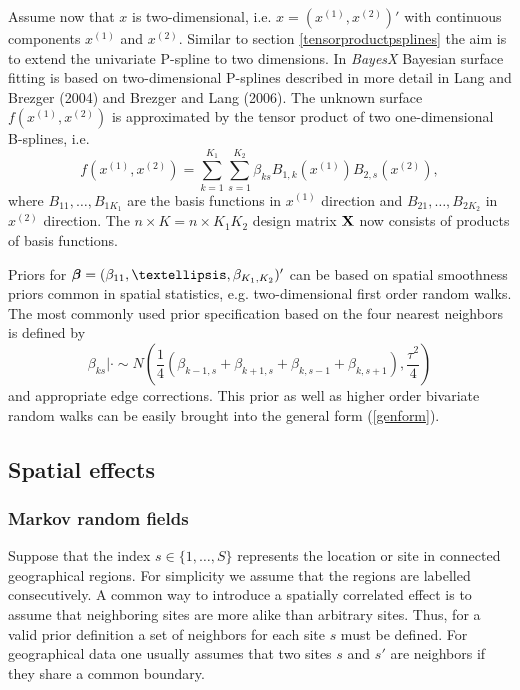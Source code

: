 \documentclass[11pt,a4paper,twoside]{bayesxarticle}
\begin{document}
Assume now that $x$ is two-dimensional, i.e. $x =
\left(x^{(1)},x^{(2)}\right)'$ with continuous components $x^{(1)}$
and $x^{(2)}$. Similar to section \ref{tensorproductpsplines} the
aim is to extend the univariate P-spline to two dimensions. In {\em
BayesX} Bayesian surface fitting is based on two-dimensional
P-splines described in more detail in Lang and Brezger (2004) and
Brezger and Lang (2006). The unknown surface $f(x^{(1)},x^{(2)})$ is
approximated by the tensor product of two one-dimensional B-splines,
i.e.
$$
f\left(x^{(1)},x^{(2)}\right) = \sum_{k=1}^{K_1}
\sum_{s=1}^{K_2} \beta_{ks} B_{1,k}(x^{(1)})
B_{2,s} (x^{(2)}),
$$
where $B_{11},\dots,B_{1K_1}$ are the basis functions in $x^{(1)}$ direction and
$B_{21},\dots,B_{2K_2}$ in $x^{(2)}$ direction.
The $n \times K = n \times K_1 K_2$ design matrix $\mathbf{X}$ now consists of
products of basis functions.

Priors for
$\betavec = (\beta_{11},\dots,\beta_{K_1,K_2})'$ can be based on
spatial smoothness priors common in spatial statistics, e.g.
two-dimensional first order random walks. The most commonly used
prior specification based on the four nearest neighbors is defined
by
\begin{equation}
\label{2dimrw1} \beta_{ks} | \cdot \sim N \left(
\frac{1}{4} ( \beta_{k-1,s}+ \beta_{k+1,s} +
\beta_{k,s-1} +\beta_{k,s+1}),\frac{\tau^2}{4}
\right)
\end{equation}
and appropriate edge corrections. This
prior as well as higher order bivariate random walks can be easily
brought into the general form (\ref{genform}).


\subsection{Spatial effects} \label{spatial}

\subsubsection{Markov random fields}

Suppose that the index $s \in \{ 1,\dots,S \}$ represents the
location or site in connected geographical regions. For simplicity
we assume that the regions are labelled consecutively. A common way
to introduce a spatially correlated effect is to assume that
neighboring sites are more alike than arbitrary sites. Thus, for a
valid prior definition a set of neighbors for each site $s$ must be
defined. For geographical data one usually assumes that two sites
$s$ and $s'$ are neighbors if they share a common boundary.
\end{document}
